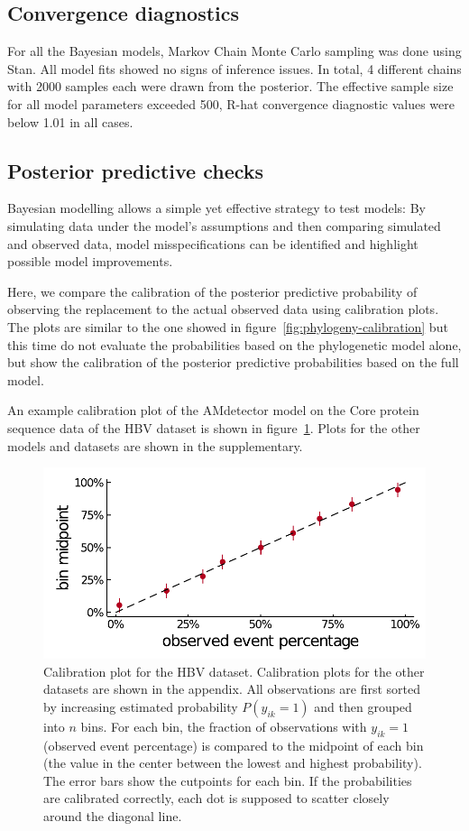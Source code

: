 \documentclass[fleqn,11pt]{SelfArx} %
\begin{document}
\subsection*{Convergence diagnostics}

For all the Bayesian models, Markov Chain Monte Carlo sampling was done using Stan. All model fits showed no signs of inference issues. In total, 4 different chains with 2000 samples each were drawn from the posterior. The effective sample size for all model parameters exceeded 500, R-hat convergence diagnostic values were below 1.01 in all cases.

\subsection*{Posterior predictive checks}

Bayesian modelling allows a simple yet effective strategy to test models: By simulating data under the model's assumptions and then comparing simulated and observed data, model misspecifications can be identified and highlight possible model improvements.

Here, we compare the calibration of the posterior predictive probability of observing the replacement to the actual observed data using calibration plots.
The plots are similar to the one showed in figure~\ref{fig:phylogeny-calibration} but this time do not evaluate the probabilities based on the phylogenetic model alone, but show the calibration of the posterior predictive probabilities based on the full model.

An example calibration plot of the AMdetector model on the Core protein sequence data of the HBV dataset is shown in figure~\ref{fig:calibration}. Plots for the other models and datasets are shown in the supplementary.

\begin{figure}[!ht]
  \includegraphics[width=1\linewidth]{plots/phylogeny_calibration.pdf}
  \caption{Calibration plot for the HBV dataset. Calibration plots for the other datasets are shown in the appendix.
  All observations are first sorted by increasing estimated probability \(P(y_{ik}=1)\) and then grouped into \(n\) bins.
  For each bin, the fraction of observations with \(y_{ik}=1\) (observed event percentage) is compared to the midpoint of each bin (the value in the center between the lowest and highest probability). The error bars show the cutpoints for each bin. If the probabilities are calibrated correctly, each dot is supposed to scatter closely around the diagonal line.}
  \label{fig:calibration}
\end{figure}
\end{document}

